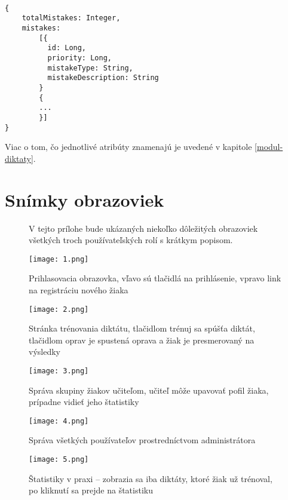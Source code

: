 \documentclass[12pt,oneside]{fithesis2}
\begin{document}
\bigskip
\lstset{language=Java}          %
\begin{lstlisting}[frame=single]  % Start your code-block

{ 
	totalMistakes: Integer,
	mistakes: 
		[{ 
		  id: Long,
		  priority: Long,
		  mistakeType: String,
		  mistakeDescription: String 	
		}
		{
		...
		}]	
}
\end{lstlisting}

\bigskip
\par Viac o tom, čo jednotlivé atribúty znamenajú je uvedené v kapitole \ref{modul-diktaty}.


\chapter{Snímky obrazoviek}  \label{screen-obraz}
		\begin{figure}
\par V tejto prílohe bude ukázaných niekoľko dôležitých obrazoviek všetkých troch používateľských rolí s krátkym  popisom.

\bigskip


		\texttt{[image: 1.png]}
	\caption{Prihlasovacia obrazovka, vľavo sú tlačidlá na prihlásenie, vpravo link na registráciu nového žiaka}
	\end{figure}
	
			\begin{figure}
		\texttt{[image: 2.png]}
	\caption{Stránka trénovania diktátu, tlačidlom trénuj sa spúšťa diktát, tlačidlom oprav je spustená oprava a žiak je presmerovaný na výsledky}
	\end{figure}
	
			\begin{figure}
		\texttt{[image: 3.png]}
	\caption{Správa skupiny žiakov učiteľom, učiteľ môže upavovať pofil žiaka, prípadne vidieť jeho štatistiky}
	\end{figure}
	
			\begin{figure}
		\texttt{[image: 4.png]}
	\caption{Správa všetkých používateľov prostredníctvom administrátora}
	\end{figure}
	
			\begin{figure}
		\texttt{[image: 5.png]}
	\caption{Štatistiky v praxi --  zobrazia sa iba diktáty, ktoré žiak už trénoval, po kliknutí sa prejde na štatistiku}
	\end{figure}
	
\end{document}
